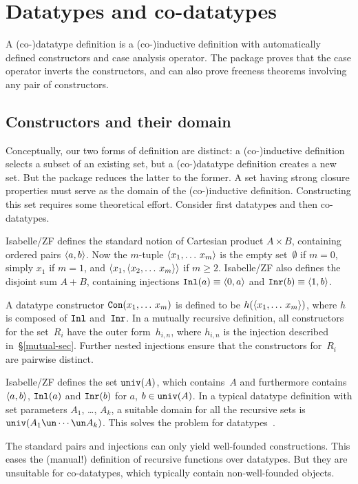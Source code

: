 \section{Datatypes and co-datatypes}\label{data-sec}
A (co-)datatype definition is a (co-)inductive definition with automatically
defined constructors and case analysis operator.  The package proves that the
case operator inverts the constructors, and can also prove freeness theorems
involving any pair of constructors.


\subsection{Constructors and their domain}
Conceptually, our two forms of definition are distinct: a (co-)inductive
definition selects a subset of an existing set, but a (co-)datatype
definition creates a new set.  But the package reduces the latter to the
former.  A set having strong closure properties must serve as the domain
of the (co-)inductive definition.  Constructing this set requires some
theoretical effort.  Consider first datatypes and then co-datatypes.

Isabelle/ZF defines the standard notion of Cartesian product $A\times B$,
containing ordered pairs $\langle a,b\rangle$.  Now the $m$-tuple
$\langle x_1,\ldots\,x_m\rangle$ is the empty set~$\emptyset$ if $m=0$, simply
$x_1$ if $m=1$, and $\langle x_1,\langle x_2,\ldots\,x_m\rangle\rangle$ if $m\geq2$.
Isabelle/ZF also defines the disjoint sum $A+B$, containing injections
${\tt Inl}(a)\equiv\langle0,a\rangle$ and ${\tt Inr}(b)\equiv\langle1,b\rangle$.

A datatype constructor ${\tt Con}(x_1,\ldots\,x_m)$ is defined to be
$h(\langle x_1,\ldots\,x_m\rangle)$, where $h$ is composed of ${\tt Inl}$ and~${\tt Inr}$.
In a mutually recursive definition, all constructors for the set~$R_i$ have
the outer form~$h_{i,n}$, where $h_{i,n}$ is the injection described
in~\S\ref{mutual-sec}.  Further nested injections ensure that the
constructors for~$R_i$ are pairwise distinct.  

Isabelle/ZF defines the set ${\tt univ}(A)$, which contains~$A$ and
furthermore contains $\langle a,b\rangle$, ${\tt Inl}(a)$ and ${\tt Inr}(b)$ for $a$,
$b\in{\tt univ}(A)$.  In a typical datatype definition with set parameters
$A_1$, \ldots, $A_k$, a suitable domain for all the recursive sets is
$\univ(A_1\un\cdots\un A_k)$.  This solves the problem for
datatypes~\cite[\S4.2]{paulson-set-II}.

The standard pairs and injections can only yield well-founded
constructions.  This eases the (manual!) definition of recursive functions
over datatypes.  But they are unsuitable for co-datatypes, which typically
contain non-well-founded objects.


